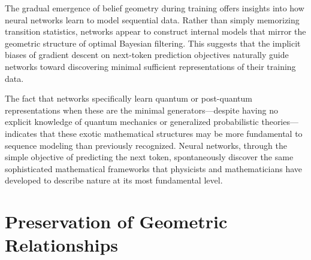 \documentclass[prx,nofootinbib,onecolumn,showkeys,groupaddress,preprintnumbers,floatfix,
superscriptaddress]{revtex4-1}
\begin{document}
The gradual emergence of belief geometry during training offers insights into how neural networks learn to model sequential data. Rather than simply memorizing transition statistics, networks appear to construct internal models that mirror the geometric structure of optimal Bayesian filtering. This suggests that the implicit biases of gradient descent on next-token prediction objectives naturally guide networks toward discovering minimal sufficient representations of their training data.

The fact that networks specifically learn quantum or post-quantum representations when these are the minimal generators—despite having no explicit knowledge of quantum mechanics or generalized probabilistic theories—indicates that these exotic mathematical structures may be more fundamental to sequence modeling than previously recognized. Neural networks, through the simple objective of predicting the next token, spontaneously discover the same sophisticated mathematical frameworks that physicists and mathematicians have developed to describe nature at its most fundamental level.

\section{Preservation of Geometric Relationships}
\end{document}
